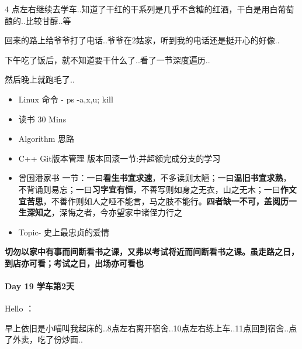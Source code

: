 \documentclass[UTF8,a4paper,8pt]{ctexart}
\begin{document}
	 	 4 点左右继续去学车..知道了干红的干系列是几乎不含糖的红酒，干白是用白葡萄酿的..比较甘醇..等
	 	 
	 	 回来的路上给爷爷打了电话..爷爷在2姑家，听到我的电话还是挺开心的好像..
	 	 
	 	 下午吃了饭后，就不知道要干什么了..看了一节深度遍历..
	 	 
	 	 然后晚上就跑毛了..
	 	 
	 	 \begin{itemize}
	 	  	\item  \makebox[0pt][l]{$\square$}\raisebox{.15ex}{\hspace{0.1em}$\checkmark$} Linux 命令 - ps -a,x,u; kill
	 	  	
	 	  	\item  \makebox[0pt][l]{$\square$}\raisebox{.15ex}{\hspace{0.1em}$\checkmark$} 读书  30 Mins		 	 
	 	  	\item  \makebox[0pt][l]{$\square$}\raisebox{.15ex}{\hspace{0.1em}$\checkmark$} Algorithm 思路
	 	  	\item  \makebox[0pt][l]{$\square$}\raisebox{.15ex}{\hspace{0.1em}$\checkmark$} C++ Git版本管理 版本回滚一节:并超额完成分支的学习
	 	  	
	 	  	\item  曾国潘家书 一节：一曰\textbf{看生书宜求速}，不多读则太陋；一曰\textbf{温旧书宜求熟}，不背诵则易忘；一曰\textbf{习字宜有恒}，不善写则如身之无衣，山之无木；一曰\textbf{作文宜苦思}，不善作则如人之哑不能言，马之肢不能行。\textbf{四者缺一不可，盖阅历一生深知之}，深悔之者，今亦望家中诸侄力行之
	 	  	
	 	  	\item  \makebox[0pt][l]{$\square$}\raisebox{.15ex}{\hspace{0.1em}$\checkmark$} Topic- 史上最忠贞的爱情
	 	 \end{itemize}
	 	 
	 	 \textbf{切勿以家中有事而间断看书之课，又弗以考试将近而间断看书之课。虽走路之日，到店亦可看；考试之日，出场亦可看也}
 	 \paragraph{Day 19  学车第2天   \quad     }
	 	 Hello ：
	 	 
	 	 早上依旧是小喵叫我起床的..8点左右离开宿舍..10点左右练上车..11点回到宿舍..点了外卖，吃了份炒面..
	 	 
\end{document}
